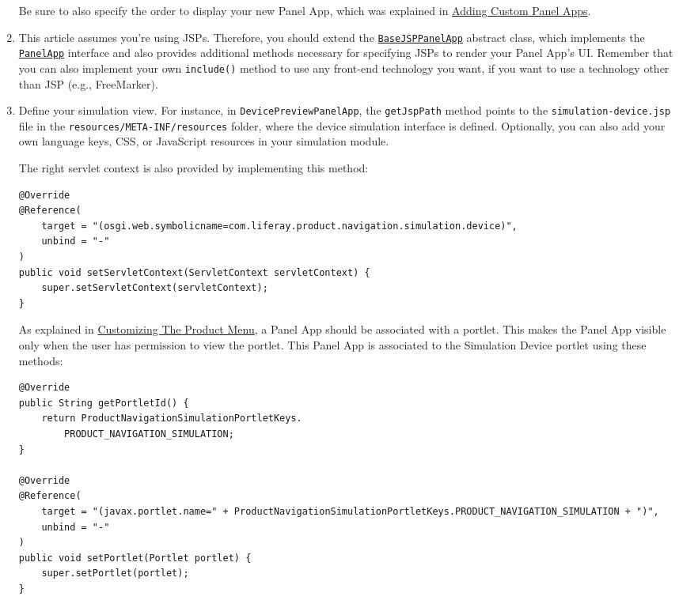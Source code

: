 \begin{enumerate}
  Be sure to also specify the order to display your new Panel App, which
  was explained in
  \href{/docs/7-2/customization/-/knowledge_base/c/adding-custom-panel-apps}{Adding
  Custom Panel Apps}.
\item
  This article assumes you're using JSPs. Therefore, you should extend
  the
  \href{https://docs.liferay.com/dxp/apps/application-list/latest/javadocs/com/liferay/application/list/BaseJSPPanelApp.html}{\texttt{BaseJSPPanelApp}}
  abstract class, which implements the
  \href{https://docs.liferay.com/dxp/apps/application-list/latest/javadocs/com/liferay/application/list/PanelApp.html}{\texttt{PanelApp}}
  interface and also provides additional methods necessary for
  specifying JSPs to render your Panel App's UI. Remember that you can
  also implement your own \texttt{include()} method to use any front-end
  technology you want, if you want to use a technology other than JSP
  (e.g., FreeMarker).
\item
  Define your simulation view. For instance, in
  \texttt{DevicePreviewPanelApp}, the \texttt{getJspPath} method points
  to the \texttt{simulation-device.jsp} file in the
  \texttt{resources/META-INF/resources} folder, where the device
  simulation interface is defined. Optionally, you can also add your own
  language keys, CSS, or JavaScript resources in your simulation module.

  The right servlet context is also provided by implementing this
  method:

\begin{verbatim}
@Override
@Reference(
    target = "(osgi.web.symbolicname=com.liferay.product.navigation.simulation.device)",
    unbind = "-"
)
public void setServletContext(ServletContext servletContext) {
    super.setServletContext(servletContext);
}
\end{verbatim}

  As explained in
  \href{/docs/7-2/customization/-/knowledge_base/c/customizing-the-product-menu}{Customizing
  The Product Menu}, a Panel App should be associated with a portlet.
  This makes the Panel App visible only when the user has permission to
  view the portlet. This Panel App is associated to the Simulation
  Device portlet using these methods:

\begin{verbatim}
@Override
public String getPortletId() {
    return ProductNavigationSimulationPortletKeys.
        PRODUCT_NAVIGATION_SIMULATION;
}

@Override
@Reference(
    target = "(javax.portlet.name=" + ProductNavigationSimulationPortletKeys.PRODUCT_NAVIGATION_SIMULATION + ")",
    unbind = "-"
)
public void setPortlet(Portlet portlet) {
    super.setPortlet(portlet);
}
\end{verbatim}


\end{enumerate}
